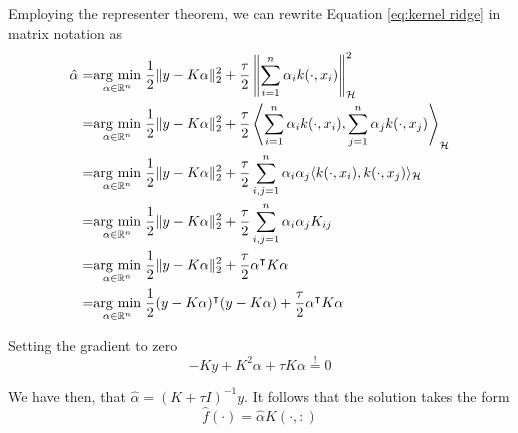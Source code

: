 Employing the representer theorem, we can rewrite Equation \ref{eq:kernel ridge} in matrix notation as
\begin{equation}
    \begin{aligned}
    \hat{\alpha}=&\underset{\alpha \in \mathbb{R}^n}{\operatorname{arg}\,\operatorname{min}}\;\frac{1}{2}\|y-K\alpha\|_2^2+\frac{\tau}{2}\left\|\sum _{i=1}^{n}\alpha _{i}k(\cdot ,x_{i})\right\|_{\mathcal{H}}^2
    \\
    =&\underset{\alpha \in \mathbb{R}^n}{\operatorname{arg}\,\operatorname{min}}\;\frac{1}{2}\|y-K\alpha\|_2^2+\frac{\tau}{2} \left\langle \sum _{i=1}^{n}\alpha _{i}k(\cdot ,x_{i}),\sum _{j=1}^{n}\alpha _{j}k(\cdot ,x_{j})\right\rangle_{\mathcal{H}}
    \\
    =&\underset{\alpha \in \mathbb{R}^n}{\operatorname{arg}\,\operatorname{min}}\;\frac{1}{2}\|y-K\alpha\|_2^2+\frac{\tau}{2} \sum _{i,j=1}^{n}\alpha _{i}\alpha _{j}\langle k(\cdot ,x_{i}),k(\cdot ,x_{j})\rangle_{\mathcal{H}}
    \\
    =&\underset{\alpha \in \mathbb{R}^n}{\operatorname{arg}\,\operatorname{min}}\;\frac{1}{2}\|y-K\alpha\|_2^2+\frac{\tau}{2} \sum _{i,j=1}^{n}\alpha _{i}\alpha _{j}K_{ij}
    \\
    =&\underset{\alpha \in \mathbb{R}^n}{\operatorname{arg}\,\operatorname{min}}\;\frac{1}{2}\|y-K\alpha\|_2^2+\frac{\tau}{2} \alpha^\intercal K \alpha
    \\
    =&\underset{\alpha \in \mathbb{R}^n}{\operatorname{arg}\,\operatorname{min}}\;\frac{1}{2}(y-K\alpha)^\intercal (y-K\alpha)+\frac{\tau}{2} \alpha^\intercal K \alpha
\end{aligned}
\end{equation}

Setting the gradient to zero
\begin{equation}
    -Ky+K^2\alpha+\tau K \alpha\overset{!}{=}0
\end{equation}

We have then, that $\hat{\alpha}=(K+\tau I)^{-1}y$. It follows that the solution takes the form
\begin{equation}
    \hat{f}(\cdot)=\hat{\alpha}K(\cdot,:)
\end{equation}

